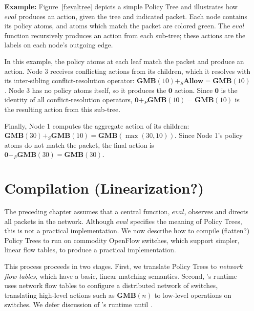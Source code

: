 \vspace{0.5em}\noindent\textbf{Example:\space}
Figure~\ref{f:evaltree} depicts a simple Policy Tree
and illustrates how $\mathit{eval}$ produces an action, given the 
tree and indicated packet.
Each node contains its policy atoms, and atoms which match the packet are colored
green. The $\mathit{eval}$ function recursively produces an action from
each sub-tree; these actions are the labels on each node's outgoing edge.

In this example, the policy atoms at each leaf match the packet and produce
an action.
Node $3$ receives conflicting actions
from its children, which it resolves with its inter-sibling
conflict-resolution operator:
$\textbf{GMB}(10)
+_S \textbf{Allow} = \textbf{GMB}(10)$. Node $3$ has no policy atoms
itself, so it produces the $\textbf{0}$ action. Since $\textbf{0}$ is
the identity of all conflict-resolution operators,
  $\textbf{0} +_P \textbf{GMB}(10) = \textbf{GMB}(10)$ is the
resulting action from this sub-tree. 

Finally, Node 1 computes the aggregate action of its children:
$\textbf{GMB}(30) +_S \textbf{GMB}(10) = \textbf{GMB}(\max(30,10))$.
Since Node 1's policy atoms do not match the packet,
the final action is
$\textbf{0} +_P \textbf{GMB}(30) = \textbf{GMB}(30)$.


\section{Compilation {\color{red} (Linearization?)}}
\label{sec:compilation}

The preceding chapter assumes that a central function,
$\mathit{eval}$, observes and directs all packets in the network.
Although $\mathit{eval}$ specifies the meaning of Policy Trees, this is not a
practical implementation. We now describe how to compile {\color{red}(flatten?)}
Policy Trees to run on commodity OpenFlow switches, which support simpler, linear
flow tables, to produce a practical implementation.

This process proceeds in two stages. First, we translate Policy Trees to
\emph{network flow tables}, which have a basic,
linear matching semantics. Second, \sys's runtime uses
network flow tables to configure a distributed network of switches,
translating high-level actions such as $\textbf{GMB}(n)$ to low-level
operations on switches. We defer discussion of \sys's runtime until
.

